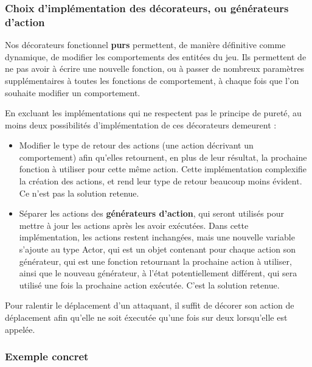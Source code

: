 \documentclass{article}
\begin{document}
\subsubsection{Choix d'implémentation des décorateurs, ou générateurs d'action}

Nos décorateurs fonctionnel \textbf{purs} permettent, de manière définitive comme dynamique, de modifier les comportements des entitées du jeu.
Ils permettent de ne pas avoir à écrire une nouvelle fonction, ou à passer de nombreux paramètres supplémentaires à toutes les fonctions de comportement, à chaque fois que l'on souhaite modifier un comportement.

En excluant les implémentations qui ne respectent pas le principe de pureté, au moins deux possibilités d'implémentation de ces décorateurs demeurent :
\begin{itemize}
    \item Modifier le type de retour des actions (une action décrivant un comportement) afin qu'elles retournent, en plus de leur résultat, la prochaine fonction à utiliser pour cette même action. Cette implémentation complexifie la création des actions, et rend leur type de retour beaucoup moins évident. Ce n'est pas la solution retenue. \label{text:decorateur1}
    \item Séparer les actions des \textbf{générateurs d'action}, qui seront utilisés pour mettre à jour les actions après les avoir exécutées. Dans cette implémentation, les actions restent inchangées, mais une nouvelle variable s'ajoute au type Actor, qui est un objet contenant pour chaque action son générateur, qui est une fonction retournant la prochaine action à utiliser, ainsi que le nouveau générateur, à l'état potentiellement différent, qui sera utilisé une fois la prochaine action exécutée. C'est la solution retenue.
\end{itemize}

Pour ralentir le déplacement d'un attaquant, il suffit de décorer son action de déplacement afin qu'elle ne soit éxecutée qu'une fois sur deux lorsqu'elle est appelée.

\subsubsection{Exemple concret}
\end{document}
